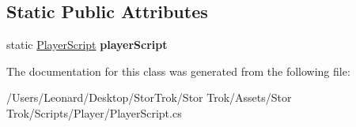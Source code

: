 \subsection*{Static Public Attributes}
\begin{DoxyCompactItemize}
\item 
\mbox{\label{class_player_script_af394b88c93e6724670fdd830c867a78b}} 
static \hyperlink{class_player_script}{Player\+Script} {\bfseries player\+Script}
\end{DoxyCompactItemize}


The documentation for this class was generated from the following file\+:\begin{DoxyCompactItemize}
\item 
/\+Users/\+Leonard/\+Desktop/\+Stor\+Trok/\+Stor Trok/\+Assets/\+Stor Trok/\+Scripts/\+Player/Player\+Script.\+cs\end{DoxyCompactItemize}
